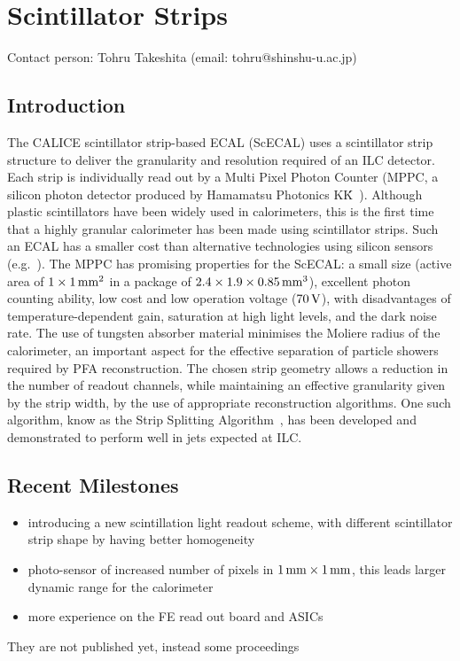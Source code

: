 \section{Scintillator Strips}
Contact person: Tohru Takeshita (email: tohru@shinshu-u.ac.jp)
\subsection{Introduction}

The CALICE scintillator strip-based ECAL (ScECAL) uses a scintillator  strip
structure to deliver the granularity and resolution required of an ILC detector.
Each strip is individually read out by a Multi Pixel Photon Counter (MPPC, a
silicon photon detector produced by Hamamatsu Photonics K\.K\.~\cite{Gomi:2007zz}). Although
plastic scintillators have been widely used in calorimeters, this is the first
time that a highly granular calorimeter has been made using scintillator strips.
Such an ECAL has a smaller cost than alternative technologies using silicon
sensors (e.g.~\cite{1748-0221-3-08-P08001}). The MPPC has promising properties for the ScECAL: a small
size (active area of $\unit[1 \times 1]{mm^2}$ in a package of $\unit[2.4 \times 1.9 \times 0.85]{mm^3}$), excellent
photon counting ability, low cost and low operation voltage ($\unit[70]{V}$), with
disadvantages of temperature-dependent gain, saturation at high light levels,
and the dark noise rate. The use of tungsten absorber material
minimises the Moliere radius of the calorimeter, an important aspect for the
effective separation of particle showers required by PFA reconstruction. The
chosen strip geometry allows a reduction in the number of readout channels,
while maintaining an effective granularity given by the strip width, by the use
of appropriate reconstruction algorithms. One such algorithm, know as the Strip
Splitting Algorithm~\cite{Kotera2015}, has been developed and demonstrated to perform well in
jets expected at ILC.

\subsection{Recent Milestones}
\begin{itemize}
	\item introducing a new scintillation light readout scheme, with different scintillator strip shape by having better homogeneity
	\item photo-sensor of increased number of pixels in $\unit[1]{mm}\times\unit[1]{mm}$, this leads larger dynamic range for the calorimeter
	\item more experience on the FE read out board and ASICs
\end{itemize}
They are not published yet, instead some proceedings

